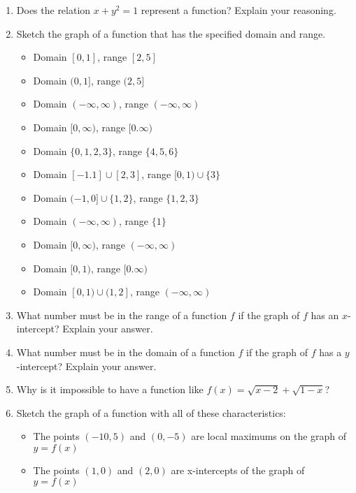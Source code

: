 \documentclass[11pt]{article}
\begin{document}
\begin{enumerate}
\item Does the relation $\displaystyle x+y^2=1$ represent a function? Explain your reasoning.

\item Sketch the graph of a function that has the specified domain and range.
\begin{itemize}
\item Domain $[0,1]$, range $[2,5]$
\item Domain $(0,1]$, range $(2,5]$
\item Domain $(-\infty,\infty)$, range $(-\infty,\infty)$
\item Domain $[0,\infty)$, range $[0.\infty)$
\item Domain $\{0,1,2,3\}$, range $\{4,5,6\}$
\item Domain $\displaystyle [-1.1]\cup [2,3]$, range $\displaystyle [0,1)\cup \{3\}$
\item Domain $\displaystyle (-1,0]\cup \{1,2\}$, range $\displaystyle  \{1,2,3\}$
\item Domain $(-\infty,\infty)$, range $\displaystyle \{ 1\}$
\item Domain $[0,\infty)$, range $(-\infty,\infty)$
\item Domain $[0,1)$, range $[0.\infty)$
\item Domain $\displaystyle [0, 1) \cup (1, 2]$, range $(-\infty,\infty)$
\end{itemize}

\item What number must be in the range of a function $f$ if the graph of $f$ has an $x$-intercept?
Explain your answer.

\item What number must be in the domain of a function $f$ if the graph of $f$ has a $y$-intercept?
Explain your answer.

\item Why is it impossible to have a function like $\displaystyle f(x)=\sqrt{x-2} + \sqrt{1-x}$? 

\item Sketch the graph of a function with  all of these characteristics:
\begin{itemize}
\item The points $(-10, 5)$ and $(0,-5)$ are local maximums on the graph of $y = f (x)$
\item The points $(1, 0)$ and $(2, 0)$ are x-intercepts of the graph of $y = f (x)$
\end{itemize}




\end{enumerate}
\end{document}
